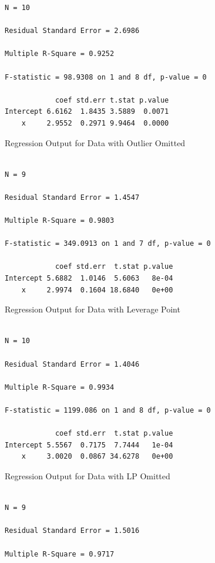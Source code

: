{{{\begin{verbatim}
N = 10

Residual Standard Error = 2.6986

Multiple R-Square = 0.9252

F-statistic = 98.9308 on 1 and 8 df, p-value = 0

            coef std.err t.stat p.value 
Intercept 6.6162  1.8435 3.5889  0.0071
    x     2.9552  0.2971 9.9464  0.0000
\end{verbatim}
}
\vspace{0.5in}
\begin{center}
Regression Output for Data with Outlier Omitted
\end{center}
{\large
\begin{verbatim}

N = 9

Residual Standard Error = 1.4547

Multiple R-Square = 0.9803

F-statistic = 349.0913 on 1 and 7 df, p-value = 0

            coef std.err  t.stat p.value 
Intercept 5.6882  1.0146  5.6063   8e-04
    x     2.9974  0.1604 18.6840   0e+00
\end{verbatim}
}
\clearpage
\begin{figure}
\end{figure}
\clearpage
\begin{center}
Regression Output for Data with Leverage Point
\end{center}
{\large
\begin{verbatim}

N = 10

Residual Standard Error = 1.4046

Multiple R-Square = 0.9934

F-statistic = 1199.086 on 1 and 8 df, p-value = 0

            coef std.err  t.stat p.value 
Intercept 5.5567  0.7175  7.7444   1e-04
    x     3.0020  0.0867 34.6278   0e+00
\end{verbatim}
}
\vspace{0.5in}
\begin{center}
Regression Output for Data with LP Omitted
\end{center}
{\large
\begin{verbatim}

N = 9

Residual Standard Error = 1.5016

Multiple R-Square = 0.9717


\end{verbatim}}}}
